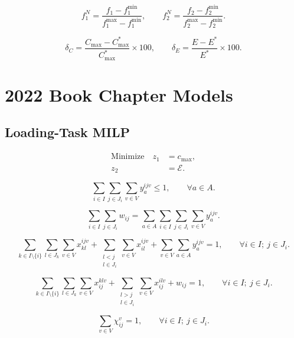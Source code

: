 \documentclass[11pt]{article}
\begin{document}
\begin{equation}
f_1^{N}
=
\frac{f_1-f_1^{\min}}{f_1^{\max}-f_1^{\min}},
\qquad
f_2^{N}
=
\frac{f_2-f_2^{\min}}{f_2^{\max}-f_2^{\min}}.
\tag{24}
\end{equation}

\[
\delta_C
=
\frac{C_{\max}-C_{\max}^{*}}{C_{\max}^{*}}
\times 100,
\qquad
\delta_E
=
\frac{E-E^{*}}{E^{*}}
\times 100.
\]

\section{2022 Book Chapter Models}

\subsection{Loading-Task MILP}

\begin{equation}
\begin{aligned}
\text{Minimize}\quad z_1 &= c_{\max},\\
z_2 &= \mathcal{E}.
\end{aligned}
\tag{B1}
\end{equation}

\begin{equation}
\sum_{i\in I}\sum_{j\in J_i}\sum_{v\in V} y_a^{ijv} \le 1,
\qquad \forall a \in A.
\tag{B2}
\end{equation}

\begin{equation}
\sum_{i\in I}\sum_{j\in J_i} w_{ij}
=
\sum_{a\in A}\sum_{i\in I}\sum_{j\in J_i}\sum_{v\in V} y_a^{ijv}.
\tag{B3}
\end{equation}

\begin{equation}
\sum_{k\in I\setminus\{i\}}\sum_{l\in J_k}\sum_{v\in V} x_{kl}^{ijv}
+
\sum_{\substack{l<j\\ l\in J_i}}\sum_{v\in V} x_{il}^{ijv}
+
\sum_{v\in V}\sum_{a\in A} y_a^{ijv}
= 1,
\qquad \forall i \in I;\ j \in J_i.
\tag{B4}
\end{equation}

\begin{equation}
\sum_{k\in I\setminus\{i\}}\sum_{l\in J_k}\sum_{v\in V} x_{ij}^{klv}
+
\sum_{\substack{l>j\\ l\in J_i}}\sum_{v\in V} x_{ij}^{ilv}
+
w_{ij}
= 1,
\qquad \forall i \in I;\ j \in J_i.
\tag{B5}
\end{equation}

\begin{equation}
\sum_{v\in V}\chi_{ij}^{v} = 1,
\qquad \forall i \in I;\ j \in J_i.
\tag{B6}
\end{equation}
\end{document}

